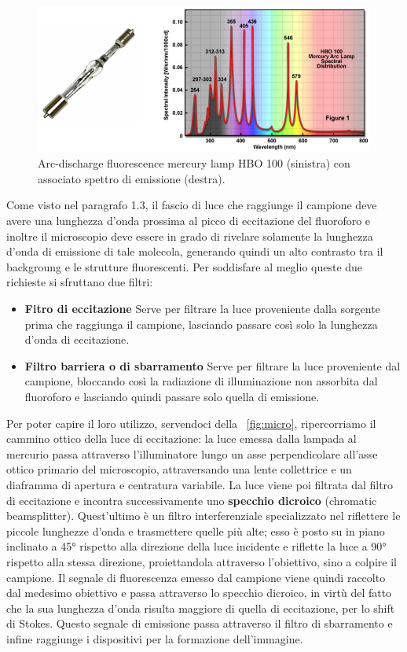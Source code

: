 \begin{figure}[!ht]
 \centering
 \includegraphics[scale=.40]{img/CAP2lampadaquarzo.png}
 \caption{\small{Arc-discharge fluorescence mercury lamp HBO 100 (sinistra) con associato spettro di emissione (destra).}}
 \label{fig:lamp}
\end{figure}

Come visto nel paragrafo 1.3, il fascio di luce che raggiunge il campione deve avere una lunghezza d'onda prossima al picco di eccitazione del fluoroforo e inoltre il microscopio deve essere in grado di rivelare solamente la lunghezza d'onda di emissione di tale molecola, generando quindi un alto contrasto tra il backgroung e le strutture fluorescenti. Per soddisfare al meglio queste due richieste si sfruttano due filtri:

\begin{itemize}
\item \textbf{Fitro di eccitazione}
Serve per filtrare la luce proveniente dalla sorgente prima che raggiunga il campione, lasciando passare così solo la lunghezza d'onda di eccitazione.
\item \textbf{Filtro barriera o di sbarramento}
Serve per filtrare la luce proveniente dal campione, bloccando così la radiazione di illuminazione non assorbita dal fluoroforo e lasciando quindi passare solo quella di emissione. 
\end{itemize}

Per poter capire il loro utilizzo, servendoci della \figurename~\ref{fig:micro}, ripercorriamo il cammino ottico della luce di eccitazione: la luce emessa dalla lampada al mercurio passa attraverso l'illuminatore lungo un asse perpendicolare all'asse ottico primario del microscopio, attraversando una lente collettrice e un diaframma di apertura e centratura variabile. La luce viene poi filtrata dal filtro di eccitazione e incontra successivamente uno \textbf{specchio dicroico} (chromatic beamsplitter). Quest'ultimo è un filtro interferenziale specializzato nel riflettere le piccole lunghezze d'onda e trasmettere quelle più alte; esso è posto su in piano inclinato a 45° rispetto alla direzione della luce incidente e riflette la luce a 90° rispetto alla stessa direzione, proiettandola attraverso l'obiettivo, sino a colpire il campione. Il segnale di fluorescenza emesso dal campione viene quindi raccolto dal medesimo obiettivo e passa attraverso lo specchio dicroico, in virtù del fatto che la sua lunghezza d'onda risulta maggiore di quella di eccitazione, per lo shift di Stokes. Questo segnale di emissione passa attraverso il filtro di sbarramento e infine raggiunge i dispositivi per la formazione dell'immagine.

